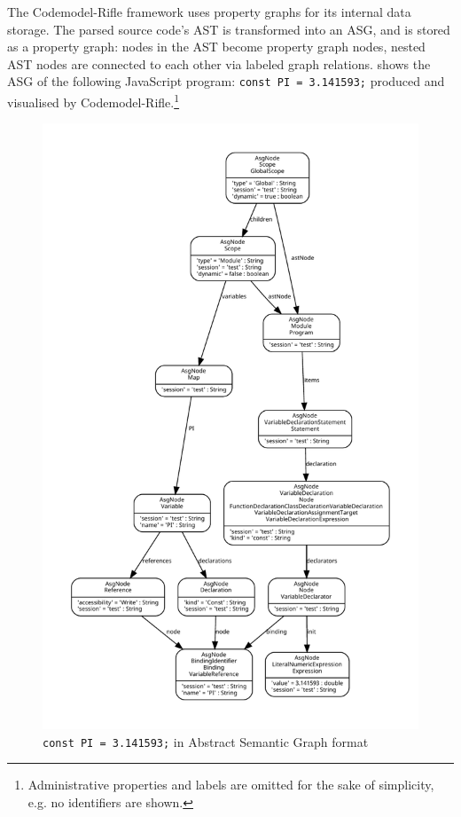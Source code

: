 The Codemodel-Rifle framework uses property graphs for its internal data storage. The parsed source code's AST is transformed into an ASG, and is stored as a property graph: nodes in the AST become property graph nodes, nested AST nodes are connected to each other via labeled graph relations.  shows the ASG of the following JavaScript program: \texttt{const PI = 3.141593;} produced and visualised by Codemodel-Rifle.\footnote{Administrative properties and labels are omitted for the sake of simplicity, e.g. no identifiers are shown.}

\begin{figure}[!p]
	\centering
	\includegraphics[height=\textheight, trim=1cm 1cm 1cm 1cm,clip]{figures/codemodel-rifle-asg.pdf}
	\caption{\texttt{const PI = 3.141593;} in Abstract Semantic Graph format}
	\label{fig:codemodel-rifle-asg}
\end{figure}

